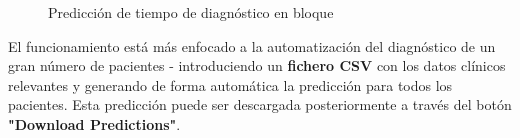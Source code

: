 \begin{figure}[h]
	\vspace{-5mm}
	\centering
	\captionsetup{belowskip=-25pt, justification=centering}
	\caption{Predicción de tiempo de diagnóstico en bloque}
	\label{fig:ch6batch}
\end{figure}

El funcionamiento está más enfocado a la automatización del diagnóstico de un gran número de pacientes - introduciendo un \textbf{fichero CSV} con los datos clínicos relevantes y generando de forma automática la predicción para todos los pacientes. Esta predicción puede ser descargada posteriormente a través del botón \textbf{"Download Predictions"}.